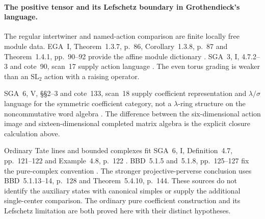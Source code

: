 \paragraph{The positive tensor and its Lefschetz boundary in Grothendieck's language.}
The regular intertwiner and named-action comparison
are finite locally free module data.
EGA~I, Theorem~1.3.7, p.~86, Corollary~1.3.8,
p.~87 and Theorem~1.4.1, pp.~90--92 provide
the affine module dictionary \cite{EGA}.
SGA~3, I, 4.7.2--3 and cote~90, scan~17 supply
action language \cite{SGA3,Archive}.
The even torus grading is weaker than an
\(\mathrm{SL}_2\) action with a raising operator.

SGA~6, V, \S\S2--3 and cote~133, scan~18
supply coefficient representation and
\(\lambda/\sigma\) language for the symmetric
coefficient category, not a \(\lambda\)-ring
structure on the noncommutative word algebra
\cite{SGA6,Archive}.
The difference between the six-dimensional action
image and sixteen-dimensional completed matrix
algebra is the explicit closure calculation above.

Ordinary Tate lines and bounded complexes fit
SGA~6, I, Definition~4.7, pp.~121--122 and
Example~4.8, p.~122 \cite{SGA6}.
BBD~5.1.5 and~5.1.8, pp.~125--127 fix the
pure-complex convention \cite{BBD}.
The stronger projective-perverse conclusion
uses BBD~5.1.13--14, p.~128 and
Theorem~5.4.10, p.~144.
These sources do not identify the auxiliary
states with canonical simples or supply the
additional single-center comparison.
The ordinary pure coefficient construction
and its Lefschetz limitation are both proved
here with their distinct hypotheses.
